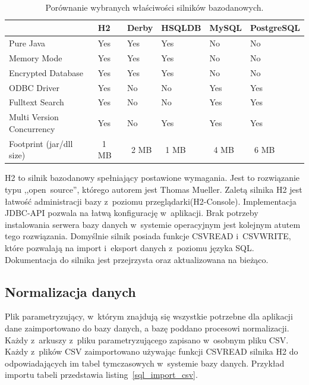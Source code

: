 \begin{table}[h]
 \caption{Porównanie wybranych właściwości silników bazodanowych.}
 \tiny\tt
 \centering
 \vspace{0in}
 \begin{tabular}{|l|l|l|l|l|l|}
 \hline
  & \textbf{H2} & \textbf{Derby} & \textbf{HSQLDB} & \textbf{MySQL} & \textbf{PostgreSQL} \\
 \hline
 Pure Java & Yes & Yes & Yes & No & No \\
 \hline
 Memory Mode & Yes & Yes & Yes & No & No \\
 \hline
 Encrypted Database & Yes & Yes & Yes & No & No \\
 \hline
 ODBC Driver & Yes & No & No & Yes & Yes \\
 \hline
 Fulltext Search & Yes & No & No & Yes & Yes \\
 \hline
 Multi Version Concurrency & Yes & No & Yes & Yes & Yes \\
 \hline
 Footprint (jar/dll size) & ~1 MB & ~2 MB & ~1 MB & ~4 MB & ~6 MB \\
 \hline
 \end{tabular}
 \label{table_h2}
\end{table}

H2 to silnik bazodanowy spełniający postawione wymagania. Jest to rozwiązanie typu \mbox{,,open source''}, którego autorem jest Thomas Mueller. Zaletą silnika H2 jest łatwość administracji bazy z~poziomu przeglądarki(H2-Console). Implementacja JDBC-API pozwala na łatwą konfigurację w~aplikacji. Brak potrzeby instalowania serwera bazy danych w~systemie operacyjnym jest kolejnym atutem tego rozwiązania. Domyślnie silnik posiada funkcje CSVREAD i~CSVWRITE, które pozwalają na import i~eksport danych z~poziomu języka SQL. Dokumentacja do silnika jest przejrzysta oraz aktualizowana na bieżąco\cite{h2_reference}.

\subsection{Normalizacja danych}
\label{sec:normalizacjaDanych}

Plik parametryzujący, w~którym znajdują się wszystkie potrzebne dla aplikacji dane zaimportowano do bazy danych, a bazę poddano procesowi normalizacji. Każdy z~arkuszy z~pliku parametryzującego zapisano w~osobnym pliku CSV. Każdy z~plików CSV zaimportowano używając funkcji CSVREAD silnika H2 do odpowiadających im tabel tymczasowych w~systemie bazy danych. Przykład importu tabeli przedstawia listing~\ref{sql_import_csv}.

